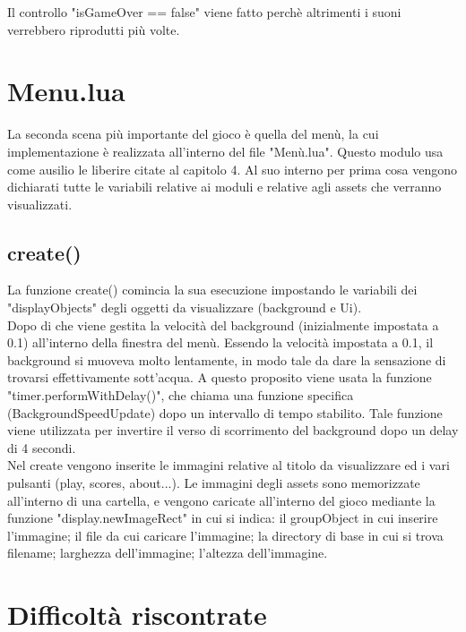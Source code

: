 \documentclass[12pt]{article}
\begin{document}
Il controllo "isGameOver == false" viene fatto perchè altrimenti i suoni verrebbero riprodutti più volte. 




\section{Menu.lua}
La seconda scena più importante del gioco è quella del menù, la cui implementazione è realizzata all'interno del file "Menù.lua". Questo modulo usa come ausilio le liberire citate al capitolo 4. Al suo interno per prima cosa vengono dichiarati tutte le variabili relative ai moduli e relative agli assets che verranno visualizzati.

\subsection{create()}
La funzione create() comincia la sua esecuzione impostando le variabili dei "displayObjects" degli oggetti da visualizzare (background e Ui). 
\\

Dopo di che viene gestita la velocità del background (inizialmente impostata a 0.1) all'interno della finestra del menù. Essendo la velocità impostata a 0.1, il background si muoveva molto lentamente, in modo tale da dare la sensazione di trovarsi effettivamente sott'acqua. A questo proposito viene usata la funzione "timer.performWithDelay()", che chiama una funzione specifica (BackgroundSpeedUpdate) dopo un intervallo di tempo stabilito. Tale funzione viene utilizzata per invertire il verso di scorrimento del background dopo un delay di 4 secondi. 
\\

Nel create vengono inserite le immagini relative al titolo da visualizzare ed i vari pulsanti (play, scores, about...). Le immagini degli assets sono memorizzate all'interno di una cartella, e vengono caricate all'interno del gioco mediante la funzione "display.newImageRect" in cui si indica: il groupObject in cui inserire l'immagine; il file da cui caricare l'immagine; la directory di base in cui si trova filename; larghezza dell'immagine; l'altezza dell'immagine. 




\section{Difficoltà riscontrate}
\end{document}
